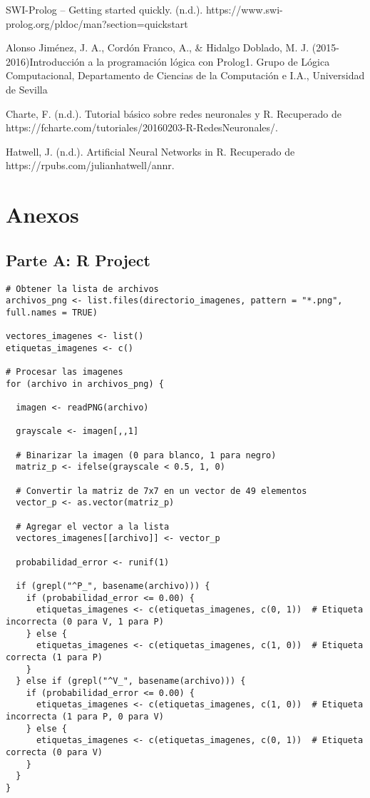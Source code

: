 \documentclass[12pt]{article}
\begin{document}
\begin{thebibliography}{9}
    SWI-Prolog -- Getting started quickly. (n.d.). https://www.swi-prolog.org/pldoc/man?section=quickstart
    
    Alonso Jiménez, J. A., Cordón Franco, A., \& Hidalgo Doblado, M. J. (2015-2016)Introducción a la programación lógica con Prolog1. Grupo de Lógica Computacional, Departamento de Ciencias de la Computación e I.A., Universidad de Sevilla
    
    Charte, F. (n.d.). Tutorial básico sobre redes neuronales y R. Recuperado de https://fcharte.com/tutoriales/20160203-R-RedesNeuronales/.
    
    Hatwell, J. (n.d.). Artificial Neural Networks in R. Recuperado de https://rpubs.com/julianhatwell/annr.
    
\end{thebibliography}
\newpage
\section{Anexos}

\subsection{Parte A: R Project}
\begin{lstlisting}[caption={Procesamiento de imágenes en R}, label={lst:procesamiento_imagenes}]
# Obtener la lista de archivos
archivos_png <- list.files(directorio_imagenes, pattern = "*.png", full.names = TRUE)

vectores_imagenes <- list()
etiquetas_imagenes <- c() 

# Procesar las imagenes
for (archivo in archivos_png) {
  
  imagen <- readPNG(archivo)
  
  grayscale <- imagen[,,1]  
  
  # Binarizar la imagen (0 para blanco, 1 para negro)
  matriz_p <- ifelse(grayscale < 0.5, 1, 0)
  
  # Convertir la matriz de 7x7 en un vector de 49 elementos
  vector_p <- as.vector(matriz_p)
  
  # Agregar el vector a la lista
  vectores_imagenes[[archivo]] <- vector_p
  
  probabilidad_error <- runif(1)  
  
  if (grepl("^P_", basename(archivo))) {
    if (probabilidad_error <= 0.00) {
      etiquetas_imagenes <- c(etiquetas_imagenes, c(0, 1))  # Etiqueta incorrecta (0 para V, 1 para P)
    } else {
      etiquetas_imagenes <- c(etiquetas_imagenes, c(1, 0))  # Etiqueta correcta (1 para P)
    }
  } else if (grepl("^V_", basename(archivo))) {
    if (probabilidad_error <= 0.00) {
      etiquetas_imagenes <- c(etiquetas_imagenes, c(1, 0))  # Etiqueta incorrecta (1 para P, 0 para V)
    } else {
      etiquetas_imagenes <- c(etiquetas_imagenes, c(0, 1))  # Etiqueta correcta (0 para V)
    }
  }
}
\end{lstlisting}
\end{document}
